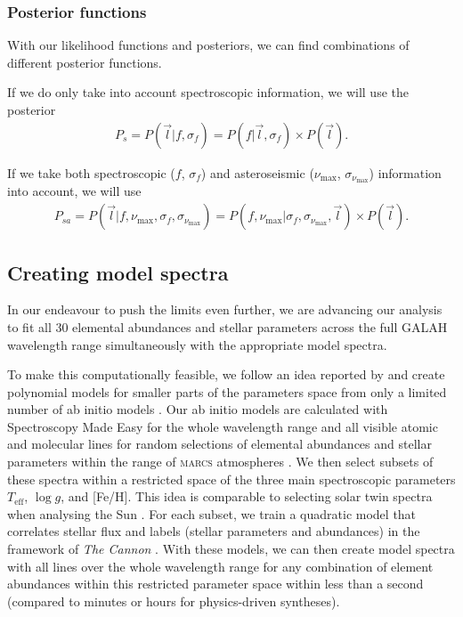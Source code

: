 \documentclass[
  journal=pasa,
  manuscript=research-paper, %
  year=2021,
  volume=37,
]{cup-journal}
\newcommand{\Teff}{$T_\mathrm{eff}$\xspace}
\newcommand{\logg}{$\log g$\xspace}
\begin{document}
\subsubsection{Posterior functions}

With our likelihood functions and posteriors, we can find combinations of different posterior functions.

If we do only take into account spectroscopic information, we will use the posterior
\begin{align}
    P_s = P ( \vec{l} \vert f, \sigma_f ) = P ( f \vert \vec{l}, \sigma_f ) \times P ( \vec{l} ).
\end{align}

If we take both spectroscopic ($f$, $\sigma_f$) and asteroseismic ($\nu_\text{max}$, $\sigma_{\nu_\text{max}}$) information into account, we will use
\begin{align}
    P_{sa} = P ( \vec{l} \vert f, \nu_\text{max}, \sigma_f , \sigma_{\nu_\text{max}}) =  P ( f, \nu_\text{max} \vert \sigma_{f}, \sigma_{\nu_\text{max}}, \vec{l} )  \times P ( \vec{l} ).
\end{align}

\subsection{Creating model spectra} \label{subsec:model_spectra}

In our endeavour to push the limits even further, we are advancing our analysis to fit all 30 elemental abundances and stellar parameters across the full GALAH wavelength range simultaneously with the appropriate model spectra.

To make this computationally feasible, we follow an idea reported by \citet{Rix2016} and create polynomial models for smaller parts of the parameters space from only a limited number of ab initio models \citep[see also][]{Ting2016b}. Our ab initio models are calculated with Spectroscopy Made Easy \citep[\textsc{sme}][]{Valenti1996,Piskunov2017} for the whole wavelength range and all visible atomic and molecular lines for random selections of elemental abundances and stellar parameters within the range of \textsc{marcs} atmospheres \citep{Gustafsson2008}. We then select subsets of these spectra within a restricted space of the three main spectroscopic parameters \Teff, \logg, and [Fe/H]. This idea is comparable to selecting solar twin spectra when analysing the Sun \citep[see e.g.][who applied this idea with tremendous success in the opposite direction]{Nissen2015}. For each subset, we train a quadratic model that correlates stellar flux and labels (stellar parameters and abundances) in the framework of \textit{The Cannon} \citep{Ness2015, Casey2016}. With these models, we can then create model spectra with all lines over the whole wavelength range for any combination of element abundances within this restricted parameter space within less than a second (compared to minutes or hours for physics-driven syntheses). 
\end{document}

